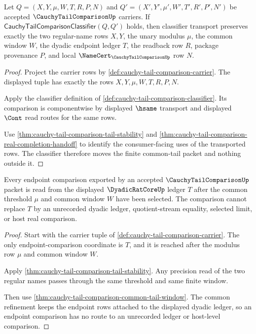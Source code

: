 \begin{theorem}
\label{thm:cauchy-tail-comparison-classifier-transport}
Let $Q=(X,Y,\mu,W,T,R,P,N)$ and
$Q'=(X',Y',\mu',W',T',R',P',N')$ be accepted
$\CauchyTailComparisonUp$ carriers. If
$\mathsf{CauchyTailComparisonClassifier}(Q,Q')$ holds, then classifier
transport preserves exactly the two regular-name rows $X,Y$, the unary
modulus $\mu$, the common window $W$, the dyadic endpoint ledger $T$, the
readback row $R$, package provenance $P$, and local
$\NameCert_{\CauchyTailComparisonUp}$ row $N$.
\end{theorem}
\begin{proof}
Project the carrier rows by
\autoref{def:cauchy-tail-comparison-carrier}. The displayed tuple has exactly
the rows $X,Y,\mu,W,T,R,P,N$.

Apply the classifier definition of
\autoref{def:cauchy-tail-comparison-classifier}. Its comparison is
componentwise by displayed $\hsame$ transport and displayed $\Cont$ read
routes for the same rows.

Use \autoref{thm:cauchy-tail-comparison-tail-stability} and
\autoref{thm:cauchy-tail-comparison-real-completion-handoff} to identify the
consumer-facing uses of the transported rows. The classifier therefore moves
the finite common-tail packet and nothing outside it.
\end{proof}

\begin{theorem}
\label{thm:cauchy-tail-comparison-dyadic-endpoint-exactness}
Every endpoint comparison exported by an accepted
$\CauchyTailComparisonUp$ packet is read from the displayed
$\DyadicRatCoreUp$ ledger $T$ after the common threshold $\mu$ and common
window $W$ have been selected. The comparison cannot replace $T$ by an
unrecorded dyadic ledger, quotient-stream equality, selected limit, or host
real comparison.
\end{theorem}
\begin{proof}
Start with the carrier tuple of
\autoref{def:cauchy-tail-comparison-carrier}. The only endpoint-comparison
coordinate is $T$, and it is reached after the modulus row $\mu$ and common
window $W$.

Apply \autoref{thm:cauchy-tail-comparison-tail-stability}. Any precision read
of the two regular names passes through the same threshold and same finite
window.

Then use \autoref{thm:cauchy-tail-comparison-common-tail-window}. The common
refinement keeps the endpoint rows attached to the displayed dyadic ledger,
so an endpoint comparison has no route to an unrecorded ledger or host-level
comparison.
\end{proof}

